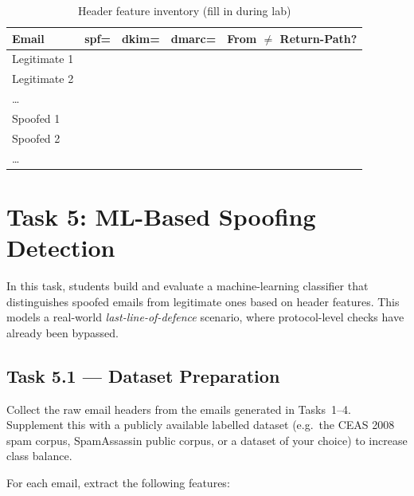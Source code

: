 \documentclass[11pt]{article}
\newcounter{task}
\begin{document}
\begin{table}[h]
\centering
\caption{Header feature inventory (fill in during lab)}
\label{tab:features}
\begin{tabular}{lcccc}
\toprule
\textbf{Email} & \textbf{spf=} & \textbf{dkim=} & \textbf{dmarc=} &
\textbf{From $\neq$ Return-Path?} \\
\midrule
Legitimate 1 & & & & \\
Legitimate 2 & & & & \\
\ldots        & & & & \\
Spoofed 1    & & & & \\
Spoofed 2    & & & & \\
\ldots        & & & & \\
\bottomrule
\end{tabular}
\end{table}

\section{Task 5: ML-Based Spoofing Detection}

In this task, students build and evaluate a machine-learning classifier
that distinguishes spoofed emails from legitimate ones based on header
features.
This models a real-world \emph{last-line-of-defence} scenario, where
protocol-level checks have already been bypassed.

\subsection{Task 5.1 --- Dataset Preparation}

Collect the raw email headers from the emails generated in Tasks~1--4.
Supplement this with a publicly available labelled dataset
(e.g.\ the CEAS 2008 spam corpus, SpamAssassin public corpus, or a
dataset of your choice) to increase class balance.

For each email, extract the following features:
\end{document}
